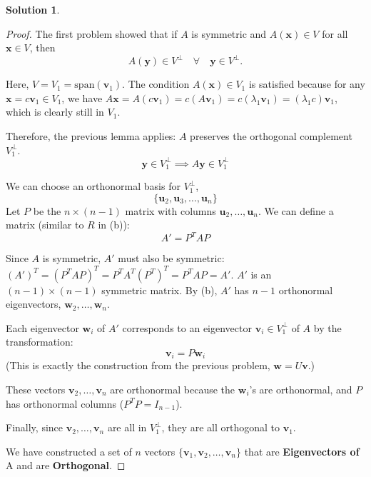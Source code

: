 \documentclass{amsart}[11pt]
\theoremstyle{definition}
\newtheorem*{solution}{Solution}
\begin{document}
\begin{solution}
\begin{enumerate}[(a)]
\begin{proof}
           The first problem showed that if $A$ is symmetric and $A(\mathbf{x}) \in V$ for all $\mathbf{x} \in V$, then 
           \[
           A(\mathbf{y}) \in V^\perp \quad\forall\quad \mathbf{y} \in V^\perp.
           \]

            Here, $V = V_1 = \text{span}(\mathbf{v}_1)$. The condition $A(\mathbf{x}) \in V_1$ is satisfied because for any $\mathbf{x} = c\mathbf{v}_1 \in V_1$, we have $A\mathbf{x} = A(c\mathbf{v}_1) = c(A\mathbf{v}_1) = c(\lambda_1 \mathbf{v}_1) = (\lambda_1 c)\mathbf{v}_1$, which is clearly still in $V_1$.
            
            Therefore, the previous lemma applies: $A$ preserves the orthogonal complement $V_1^\perp$.
                $$\mathbf{y} \in V_1^\perp \implies A\mathbf{y} \in V_1^\perp$$

            We can choose an orthonormal basis for $V_1^\perp$, 
            $$ \{\mathbf{u}_2, \mathbf{u}_3, \dots, \mathbf{u}_n\}$$
            Let $P$ be the $n \times (n-1)$ matrix with columns $\mathbf{u}_2, \dots, \mathbf{u}_n$. We can define a matrix  (similar to $R$ in (b)):
            \[
                A' = P^T A P
            \]

            Since $A$ is symmetric, $A'$ must also be symmetric: $(A')^T = (P^T A P)^T = P^T A^T (P^T)^T = P^T A P = A'$. $A'$ is an $(n-1) \times (n-1)$ symmetric matrix. By (b), $A'$ has $n-1$ orthonormal eigenvectors, $\mathbf{w}_2, \dots, \mathbf{w}_n$.

            Each eigenvector $\mathbf{w}_i$ of $A'$ corresponds to an eigenvector $\mathbf{v}_i \in V_1^\perp$ of $A$ by the transformation:
                $$\mathbf{v}_i = P \mathbf{w}_i$$
            (This is exactly the construction from the previous problem, $\mathbf{w} = U\mathbf{v}$.)

            These vectors $\mathbf{v}_2, \dots, \mathbf{v}_n$ are orthonormal because the $\mathbf{w}_i$'s are orthonormal, and $P$ has orthonormal columns ($P^T P = I_{n-1}$).

            Finally, since $\mathbf{v}_2, \dots, \mathbf{v}_n$ are all in $V_1^\perp$, they are all orthogonal to $\mathbf{v}_1$.

            We have constructed a set of $n$ vectors $\{\mathbf{v}_1, \mathbf{v}_2, \dots, \mathbf{v}_n\}$ that are \textbf{Eigenvectors of} A and are \textbf{Orthogonal}.

    \end{proof}
    \end{enumerate}
\end{solution}
\end{document}
